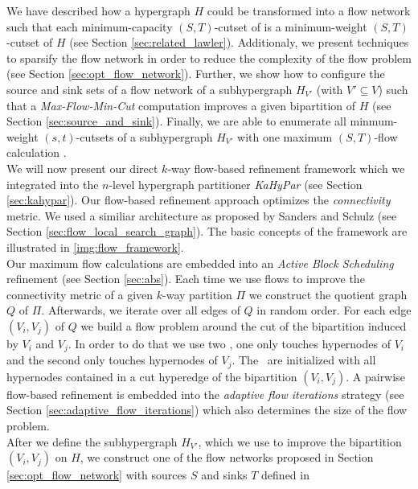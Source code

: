 We have described how a hypergraph $H$ could be transformed into
a flow network  such that each minimum-capacity $(S,T)$-cutset of  is a 
minimum-weight  $(S,T)$-cutset of $H$ (see Section \ref{sec:related_lawler}). 
Additionaly, we present techniques to sparsify the
flow network  \cite{lawler1973} in order to reduce the complexity of 
the flow problem (see Section \ref{sec:opt_flow_network}). 
Further, we show how to configure the source and sink sets of a flow network of a 
subhypergraph $H_{V'}$ (with $V' \subseteq V$) such that a \emph{Max-Flow-Min-Cut} 
computation improves a given bipartition of $H$ (see Section \ref{sec:source_and_sink}). 
Finally, we are able to enumerate all minmum-weight $(s,t)$-cutsets of a subhypergraph 
$H_{V'}$ with one maximum $(S,T)$-flow calculation \cite{picard1980structure}. \\
We will now present our direct $k$-way flow-based refinement framework which we integrated
into the $n$-level hypergraph partitioner \emph{KaHyPar} \cite{heuer2017improving} 
(see Section \ref{sec:kahypar}). Our flow-based refinement approach optimizes
the \emph{connectivity} metric. We used a similiar architecture as proposed
by Sanders and Schulz \cite{sanders2011engineering} (see Section 
\ref{sec:flow_local_search_graph}). The basic concepts of the framework are
illustrated in \autoref{img:flow_framework}. \\
Our maximum flow calculations are embedded into an \emph{Active Block Scheduling}
refinement \cite{holtgrewe2010engineering} (see Section \ref{sec:abs}).
Each time we use flows to improve the connectivity metric of
a given $k$-way partition $\Pi$ we construct the quotient graph $Q$ of $\Pi$. 
Afterwards, we iterate over all edges of $Q$ in random order. For each edge
$(V_i,V_j)$ of $Q$ we build a flow problem around the cut of the bipartition
induced by $V_i$ and $V_j$. In order to do that we use two \BFS, one only 
touches hypernodes of $V_i$ and the second only touches hypernodes of $V_j$.
The \BFS~are initialized with all hypernodes contained in a cut hyperedge
of the bipartition $(V_i,V_j)$. A pairwise flow-based refinement is embedded
into the \emph{adaptive flow iterations} strategy \cite{sanders2011engineering}
(see Section \ref{sec:adaptive_flow_iterations}) which also determines
the size of the flow problem. \\
After we define the subhypergraph $H_{V'}$, which we use to improve the bipartition
$(V_i,V_j)$ on $H$, we construct one of the flow networks proposed in Section
\ref{sec:opt_flow_network} with sources $S$ and sinks $T$ defined in
